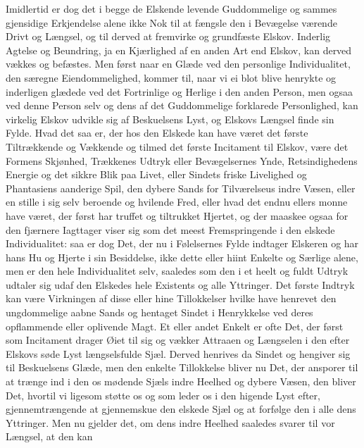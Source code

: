 \documentclass[12pt,a4paper]{book}
\newcommand{\apage}[1]{\marginnote{\footnotesize\textit{[#1]}}}
\begin{document}
Imidlertid er dog det i begge de Elskende levende Guddommelige og
sammes gjensidige Erkjendelse alene ikke Nok til at fængsle den i
Bevægelse værende Drivt og Længsel, og til derved at fremvirke og
grundfæste Elskov. Inderlig Agtelse og Beundring, ja en Kjærlighed af
en anden Art end Elskov, kan derved vækkes og befæstes. Men først naar
en Glæde ved den personlige Individualitet, den særegne
Eiendommelighed, kommer til, naar vi ei blot blive henrykte og
inderligen glædede ved det Fortrinlige og Herlige i den anden Person,
men ogsaa ved denne Person selv og dens af det Guddommelige forklarede
Personlighed, kan virkelig Elskov udvikle sig af Beskuelsens Lyst, og
Elskovs Længsel finde sin Fylde. Hvad det saa er, der hos den Elskede
kan have været det første Tiltrækkende og Vækkende og tilmed det første
Incitament til Elskov, være det Formens Skjønhed, Trækkenes Udtryk
eller Bevægelsernes Ynde, Retsindighedens Energie og det sikkre Blik
paa Livet, eller Sindets friske Livelighed og Phantasiens aanderige
Spil, den dybere Sands for Tilværelseus indre Væsen, eller en stille i
sig selv beroende og hvilende Fred, eller hvad det endnu ellers monne
have været, der først har truffet og tiltrukket Hjertet, og der maaskee
ogsaa for den fjærnere Iagttager viser \apage{10} sig som det meest Fremspringende
i den elskede Individualitet: saa er dog Det, der nu i Følelsernes
Fylde indtager Elskeren og har hans Hu og Hjerte i sin Besiddelse, ikke
dette eller hiint Enkelte og Særlige alene, men er den hele
Individualitet selv, saaledes som den i et heelt og fuldt Udtryk
udtaler sig udaf den Elskedes hele Existents og alle Yttringer. Det
første Indtryk kan være Virkningen af disse eller hine Tillokkelser
hvilke have henrevet den ungdommelige aabne Sands og hentaget Sindet i
Henrykkelse ved deres opflammende eller oplivende Magt. Et eller andet
Enkelt er ofte Det, der først som Incitament drager Øiet til sig og
vækker Attraaen og Længselen i den efter Elskovs søde Lyst
længselsfulde Sjæl. Derved henrives da Sindet og hengiver sig til
Beskuelsens Glæde, men den enkelte Tillokkelse bliver nu Det, der
ansporer til at trænge ind i den os mødende Sjæls indre Heelhed og
dybere Væsen, den bliver Det, hvortil vi ligesom støtte os og som leder
os i den higende Lyst efter, gjennemtrængende at gjennemskue den
elskede Sjæl og at forfølge den i alle dens Yttringer. Men nu gjelder
det, om dens indre Heelhed saaledes svarer til vor Længsel, at den kan
\end{document}
